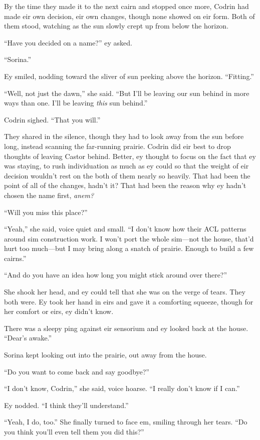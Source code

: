 By the time they made it to the next cairn and stopped once more, Codrin had made eir own decision, eir own changes, though none showed on eir form. Both of them stood, watching as the sun slowly crept up from below the horizon.

``Have you decided on a name?'' ey asked.

``Sorina.''

Ey smiled, nodding toward the sliver of sun peeking above the horizon. ``Fitting.''

``Well, not just the dawn,'' she said. ``But I'll be leaving our sun behind in more ways than one. I'll be leaving \emph{this} sun behind.''

Codrin sighed. ``That you will.''

They shared in the silence, though they had to look away from the sun before long, instead scanning the far-running prairie. Codrin did eir best to drop thoughts of leaving Castor behind. Better, ey thought to focus on the fact that ey was staying, to rush individuation as much as ey could so that the weight of eir decision wouldn't rest on the both of them nearly so heavily. That had been the point of all of the changes, hadn't it? That had been the reason why ey hadn't chosen the name first, \emph{anem?}

``Will you miss this place?''

``Yeah,'' she said, voice quiet and small. ``I don't know how their ACL patterns around sim construction work. I won't port the whole sim—not the house, that'd hurt too much—but I may bring along a snatch of prairie. Enough to build a few cairns.''

``And do you have an idea how long you might stick around over there?''

She shook her head, and ey could tell that she was on the verge of tears. They both were. Ey took her hand in eirs and gave it a comforting squeeze, though for her comfort or eirs, ey didn't know.

There was a sleepy ping against eir sensorium and ey looked back at the house. ``Dear's awake.''

Sorina kept looking out into the prairie, out away from the house.

``Do you want to come back and say goodbye?''

``I don't know, Codrin,'' she said, voice hoarse. ``I really don't know if I can.''

Ey nodded. ``I think they'll understand.''

``Yeah, I do, too.'' She finally turned to face em, smiling through her tears. ``Do you think you'll even tell them you did this?''

